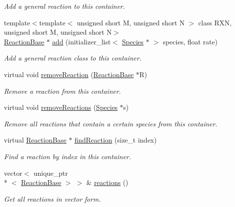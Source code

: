 \begin{DoxyCompactItemize}
\begin{DoxyCompactList}\small\item\em Add a general reaction to this container. \end{DoxyCompactList}\item 
{\footnotesize template$<$template$<$ unsigned short M, unsigned short N $>$ class R\+X\+N, unsigned short M, unsigned short N$>$ }\\\hyperlink{classReactionBase}{Reaction\+Base} $\ast$ \hyperlink{classReactionPtrContainerVector_a21f6062905689351eed7fdafd96dac31}{add} (initializer\+\_\+list$<$ \hyperlink{classSpecies}{Species} $\ast$ $>$ species, float rate)
\begin{DoxyCompactList}\small\item\em Add a general reaction class to this container. \end{DoxyCompactList}\item 
virtual void \hyperlink{classReactionPtrContainerVector_ad45ecd42eef045ee5f6faeaf6993af6d}{remove\+Reaction} (\hyperlink{classReactionBase}{Reaction\+Base} $\ast$R)
\begin{DoxyCompactList}\small\item\em Remove a reaction from this container. \end{DoxyCompactList}\item 
virtual void \hyperlink{classReactionPtrContainerVector_aafd32b6e4ff55e7ae1089026ffeb6732}{remove\+Reactions} (\hyperlink{classSpecies}{Species} $\ast$s)
\begin{DoxyCompactList}\small\item\em Remove all reactions that contain a certain species from this container. \end{DoxyCompactList}\item 
virtual \hyperlink{classReactionBase}{Reaction\+Base} $\ast$ \hyperlink{classReactionPtrContainerVector_a0bc2ed66bbd60af16e607eecf08a0979}{find\+Reaction} (size\+\_\+t index)
\begin{DoxyCompactList}\small\item\em Find a reaction by index in this container. \end{DoxyCompactList}\item 
vector$<$ unique\+\_\+ptr\\*
$<$ \hyperlink{classReactionBase}{Reaction\+Base} $>$ $>$ \& \hyperlink{classReactionPtrContainerVector_a05d57222d76ec07637ca07a0d6974559}{reactions} ()
\begin{DoxyCompactList}\small\item\em Get all reactions in vector form. \end{DoxyCompactList}\item 

\end{DoxyCompactItemize}
